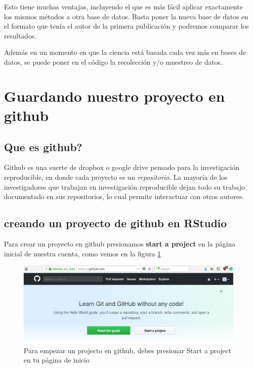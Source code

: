 \documentclass[]{book}
\begin{document}
Esto tiene muchas ventajas, incluyendo el que es más fácil aplicar
exactamente los mismos métodos a otra base de datos. Basta poner la
nueva base de datos en el formato que tenía el autor de la primera
publicación y podremos comparar los resultados.

Además en un momento en que la ciencia está basada cada vez más en bases
de datos, se puede poner en el código la recolección y/o muestreo de
datos.

\hypertarget{guardando-nuestro-proyecto-en-github}{%
\section{Guardando nuestro proyecto en
github}\label{guardando-nuestro-proyecto-en-github}}

\hypertarget{que-es-github}{%
\subsection{Que es github?}\label{que-es-github}}

Github es una suerte de dropbox o google drive pensado para la
investigación reproducible, en donde cada proyecto es un
\emph{repositorio}. La mayoría de los investigadores que trabajan en
investigación reproducible dejan todo su trabajo documentado en sus
repositorios, lo cual permite interactuar con otros autores.

\hypertarget{creando-un-proyecto-de-github-en-rstudio}{%
\subsection{creando un proyecto de github en
RStudio}\label{creando-un-proyecto-de-github-en-rstudio}}

Para crear un proyecto en github presionamos \textbf{start a project} en
la página inicial de nuestra cuenta, como vemos en la figura
\ref{fig:Start}

\begin{figure}

{\centering \includegraphics[width=0.8\linewidth]{StartAProject} 

}

\caption{Para empezar un projecto en github, debes presionar Start a project en tu página de inicio}\label{fig:Start}
\end{figure}
\end{document}
